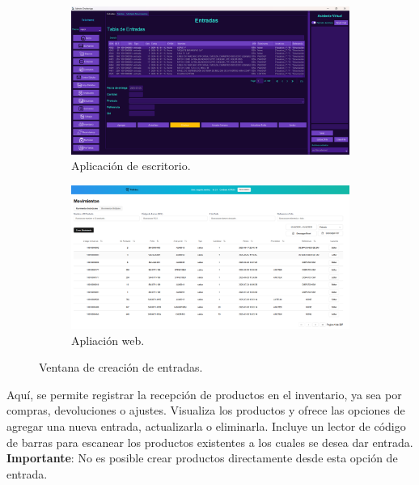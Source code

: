 \begin{figure}[ht!]
\centering
\begin{subfigure}{0.45\textwidth}
    \includegraphics[width=\textwidth]{imgs/InsApp.png}
    \caption{Aplicación de escritorio.}
    \label{fig:ins1}
\end{subfigure}
\hfill
\begin{subfigure}{0.45\textwidth}
    \includegraphics[width=\textwidth]{imgs/Almacen_General/movimientos/movimientos_individuales/movimientos_crear.png}
    \caption{Apliación web.}
    \label{fig:ins2}
\end{subfigure}        
\caption{Ventana de creación de entradas.}
\label{fig:ins}
\end{figure}



Aquí, se permite registrar la recepción de productos en el inventario, ya sea por compras, devoluciones o ajustes. Visualiza los productos y ofrece las opciones de agregar una nueva entrada, actualizarla o eliminarla. Incluye un lector de código de barras para escanear los productos existentes a los cuales se desea dar entrada. 
\textbf{Importante}: No es posible crear productos directamente desde esta opción de entrada. 

